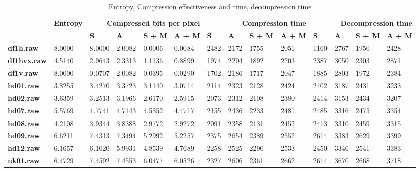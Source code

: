 \begin{table}
\centering
\footnotesize
\begin{tabular}{ll|llll|llll|llll}
    & \textbf{Entropy} & \multicolumn{4}{r|}{\textbf{Compressed bits per pixel}} & \multicolumn{4}{r|}{\textbf{Compression time}} & \multicolumn{4}{r}{\textbf{Decompression time}} \\
    &  & \textbf{S} & \textbf{A} & \textbf{S + M} & \textbf{A + M} & \textbf{S} & \textbf{A} & \textbf{S + M} & \textbf{A + M} & \textbf{S} & \textbf{A} & \textbf{S + M} & \textbf{A + M} \\
\hline
    \textbf{df1h.raw} & 8.0000 & 8.0000 & 2.0082 & 0.0006 & 0.0084 & 2482 & 2172 & 1755 & 2051 & 1160 & 2767 & 1950 & 2428 \\
    \textbf{df1hvx.raw} & 4.5140 & 2.9643 & 2.3313 & 1.1136 & 0.8899 & 1974 & 2204 & 1892 & 2203 & 2387 & 3050 & 2303 & 2871 \\
    \textbf{df1v.raw} & 8.0000 & 0.0707 & 2.0082 & 0.0395 & 0.0290 & 1702 & 2186 & 1717 & 2047 & 1885 & 2803 & 1972 & 2384 \\
    \textbf{hd01.raw} & 3.8255 & 3.4270 & 3.3723 & 3.1140 & 3.0714 & 2114 & 2323 & 2128 & 2424 & 2402 & 3187 & 2431 & 3233 \\
    \textbf{hd02.raw} & 3.6359 & 3.2513 & 3.1966 & 2.6170 & 2.5915 & 2073 & 2312 & 2108 & 2380 & 2414 & 3153 & 2434 & 3207 \\
    \textbf{hd07.raw} & 5.5769 & 4.7741 & 4.7143 & 4.5352 & 4.4717 & 2155 & 2436 & 2233 & 2481 & 2485 & 3316 & 2475 & 3354 \\
    \textbf{hd08.raw} & 4.2108 & 3.9344 & 3.8388 & 2.9772 & 2.9272 & 2091 & 2358 & 2131 & 2452 & 2413 & 3310 & 2459 & 3315 \\
    \textbf{hd09.raw} & 6.6211 & 7.4313 & 7.3494 & 5.2992 & 5.2257 & 2375 & 2654 & 2389 & 2552 & 2614 & 3383 & 2629 & 3399 \\
    \textbf{hd12.raw} & 6.1657 & 6.1020 & 5.9931 & 4.8539 & 4.7689 & 2258 & 2525 & 2290 & 2533 & 2450 & 3346 & 2541 & 3383 \\
    \textbf{nk01.raw} & 6.4729 & 7.4592 & 7.4553 & 6.0477 & 6.0526 & 2327 & 2606 & 2361 & 2662 & 2614 & 3670 & 2668 & 3718 \\
\end{tabular}
\caption{Entropy, Compression effectiveness and time, decompression time}
\end{table}
